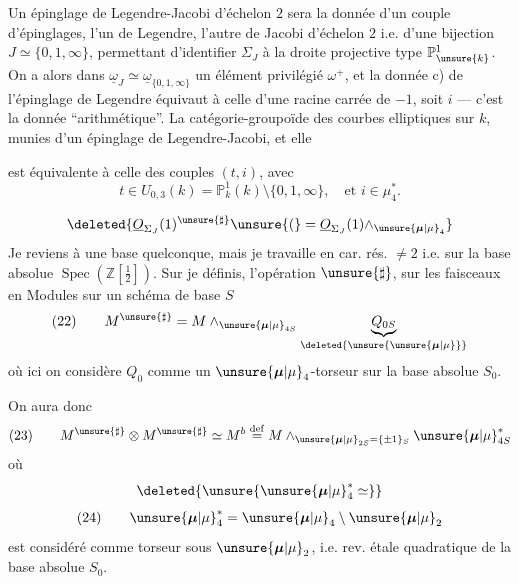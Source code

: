 Un épinglage de Legendre-Jacobi d'échelon $2$  sera la donnée d'un couple d'épinglages, l'un de Legendre, l'autre de Jacobi d'échelon $2$ i.e. d'une bijection $J\simeq\{0,1,\infty\}$, permettant d'identifier $\Sigma_J$ à la droite projective type $\mathbb{P}^1_{\unsure{k}}$. On a alors dans $\underline{\omega}_J\simeq\underline{\omega}_{\{0,1,\infty\}}$ un élément privilégié $\omega^+$, et la donnée c)  de l'épinglage de Legendre équivaut à celle d'une racine carrée  de $-1$, soit $i$ --- c'est la donnée ``arithmétique''.  La catégorie-groupoïde des courbes elliptiques sur $k$, munies d'un épinglage de Legendre-Jacobi,   et elle


est équivalente à celle des couples $(t,i)$, avec
\[
t\in U_{0,3}(k)=\mathbb{P}^1_k(k)\setminus\{0,1,\infty\},\quad\text{et }i\in\mu_4^*.
\]

\[
\deleted{\underline{O}_{\Sigma_J}(1)^{\unsure{\sharp}}\unsure{(}=\underline{O}_{\Sigma_J}(1)\wedge_{\unsure{\boldsymbol{\mu}|\mu}_4}}
\]
Je reviens à une base quelconque, mais je travaille en car. rés. $\ne2$ i.e. sur la base absolue $\operatorname{Spec}(\mathbb{Z}[\frac12])$. Sur  je définis, l'opération \deleted{\unsure{$\otimes$}} $\unsure{\sharp}$, sur les  faisceaux en Modules  sur un schéma de base $S$
\[
(22)\qquad M^{\unsure{\sharp}}=M\wedge_{\unsure{\boldsymbol{\mu}|\mu}_{4S}}\underbrace{Q_{0S}}_{\deleted{\unsure{\unsure{\boldsymbol{\mu}|\mu}}}}
\]
où ici on considère $Q_0$ comme un $\unsure{\boldsymbol{\mu}|\mu}_4$-torseur sur la base absolue $S_0$.

On aura donc
\[
(23)\qquad M^{\unsure{\sharp}}\otimes M^{\unsure{\sharp}}\simeq M^b\overset{\mathrm{def}}{=}M\wedge_{\unsure{\boldsymbol{\mu}|\mu}_{2S}=\{\pm1\}_S}\unsure{\boldsymbol{\mu}|\mu}_{4S}^*
\]
où
\[
\deleted{\unsure{\unsure{\boldsymbol{\mu}|\mu}_4^*\simeq}}
\]
\[
(24)\qquad\unsure{\boldsymbol{\mu}|\mu}_4^*=\unsure{\boldsymbol{\mu}|\mu}_4\setminus\unsure{\boldsymbol{\mu}|\mu}_2
\]
est considéré comme torseur sous $\unsure{\boldsymbol{\mu}|\mu}_2$, i.e. rev. étale quadratique de la base absolue $S_0$.

